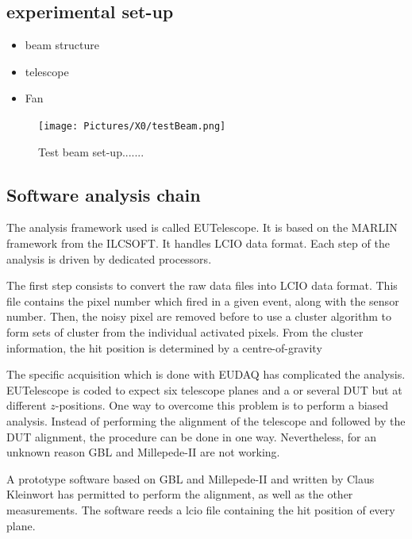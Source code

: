     \subsection{experimental set-up}

    \begin{itemize}
      \item beam structure
      \item telescope
      \item Fan
    \end{itemize}

    \begin{figure}
      \centering
      \texttt{[image: Pictures/X0/testBeam.png]}
      \caption{Test beam set-up.......}
      \label{fig:testBeam}
    \end{figure}

    \subsection{Software analysis chain}

    The analysis framework used is called EUTelescope.
    It is based on the MARLIN framework from the ILCSOFT.
    It handles LCIO data format.
    Each step of the analysis is driven by dedicated processors.

    The first step consists to convert the raw data files into LCIO data format.
    This file contains the pixel number which fired in a given event, along with the sensor number.
    Then, the noisy pixel are removed before to use a cluster algorithm to form sets of cluster from the individual activated pixels.
    From the cluster information, the hit position is determined by a centre-of-gravity 

    The specific acquisition which is done with EUDAQ has complicated the analysis.
    EUTelescope is coded to expect six telescope planes and a or several \gls{DUT} but at different $z$-positions.
    One way to overcome this problem is to perform a biased analysis. 
    Instead of performing the alignment of the telescope and followed by the \gls{DUT} alignment, the procedure can be done in one way.
    Nevertheless, for an unknown reason GBL and Millepede-II are not working.

    A prototype software based on GBL and Millepede-II and written by Claus Kleinwort has permitted to perform the alignment, as well as the other measurements.
    The software reeds a lcio file containing the hit position of every plane.

